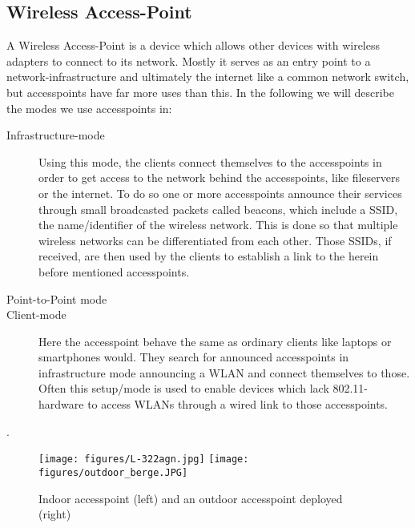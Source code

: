   \subsection{Wireless Access-Point}
    A Wireless Access-Point is a device which allows other devices with wireless adapters to connect to its network.
    Mostly it serves as an entry point to a network-infrastructure and ultimately the internet like a common network switch, 
    but accesspoints have far more uses than this. In the following we will describe the modes we use accesspoints in:
    \begin{description}
      \item[Infrastructure-mode]
	Using this mode, the clients connect themselves to the accesspoints in order to get access to the network behind the accesspoints, like fileservers or the internet.
	To do so one or more accesspoints announce their services through small broadcasted packets called beacons, which include a \ac{SSID}, 
	the name/identifier of the wireless network. This is done 
	so that multiple wireless networks can be differentiated from each other. Those SSIDs, if received, are then used by the clients to
	establish a link to the herein before mentioned accesspoints.

      \item [Point-to-Point mode]
	
      \item [Client-mode]
	Here the accesspoint behave the same as ordinary clients like laptops or smartphones would.
	They search for announced accesspoints in infrastructure mode announcing a \ac{WLAN} and connect themselves to those.
	Often this setup/mode is used to enable devices which lack 802.11-hardware to access WLANs through a wired link to those accesspoints.

    \end{description}
    \cite{Akyildiz2005445}.
    \begin{figure}[h!]
      \centerline{
	\texttt{[image: figures/L-322agn.jpg]}
	\texttt{[image: figures/outdoor\_berge.JPG]}
      }
      \caption{Indoor accesspoint (left) and an outdoor accesspoint deployed (right) \cite{lancom}}
      \label{fig:L-322agn}
    \end{figure}
     
